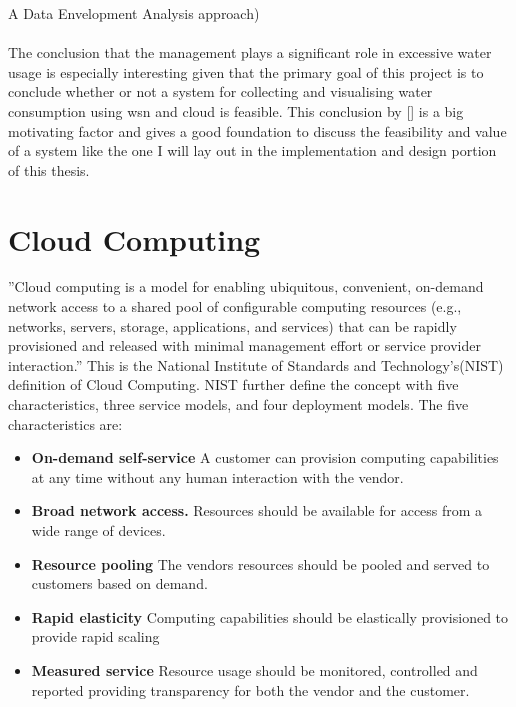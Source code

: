 \documentclass[]{uiophd}
\begin{document}
A Data Envelopment Analysis approach)
\\\\
The conclusion that the management plays a significant role in excessive water usage is especially interesting given that the primary goal of this project is to conclude whether or not a system for collecting and visualising water consumption using wsn and cloud is feasible. This conclusion by [] is a big motivating factor and gives a good foundation to discuss the feasibility and value of a system like the one I will lay out in the implementation and design portion of this thesis.

\section{Cloud Computing}
''Cloud computing is a model for enabling ubiquitous, convenient, on-demand network access to a shared pool of configurable computing resources (e.g., networks, servers, storage, applications, and services) that can be rapidly provisioned and released with minimal management effort or service provider interaction.''\cite{Mell:2011:SND:2206223} This is the National Institute of Standards and Technology's(NIST) definition of Cloud Computing. NIST further define the concept with five characteristics, three service models, and four deployment models\cite{Mell:2011:SND:2206223}. The five characteristics are:
\begin{itemize}
\item \textbf{On-demand self-service} A customer can provision computing capabilities at any time without any human interaction with the vendor.
\item \textbf{Broad network access.} Resources should be available for access from a wide range of devices.
\item \textbf{Resource pooling} The vendors resources should be pooled and served to customers based on demand.
\item \textbf{Rapid elasticity} Computing capabilities should be elastically provisioned to provide rapid scaling 
\item \textbf{Measured service} Resource usage should be monitored, controlled and reported providing transparency for both the vendor and the customer.
\end{itemize}
\end{document}
